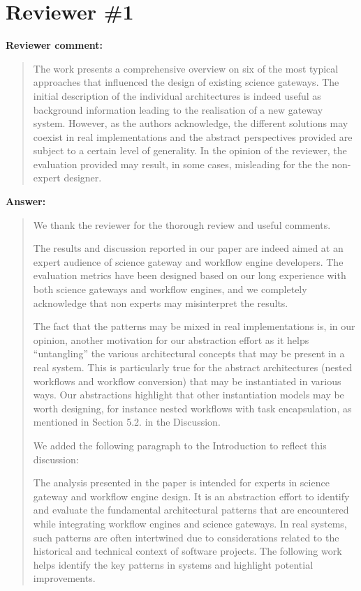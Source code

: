\documentclass[a4]{article}
\newenvironment{review}%
{\textbf{Reviewer comment:}\begin{quote}}%
{\end{quote}}%
\newenvironment{answer}%
{\textbf{Answer:}\begin{small}\begin{quote}}%
{\end{quote}\end{small}}%
\newcommand{\revised}[1]{\color{blue} #1\color{black}\xspace}
\begin{document}
\section{Reviewer \#1}

\begin{review}
  The work presents a comprehensive overview on six of the most
  typical approaches that influenced the design of existing science
  gateways. The initial description of the individual architectures is
  indeed useful as background information leading to the realisation
  of a new gateway system. However, as the authors acknowledge, the
  different solutions may coexist in real implementations and the
  abstract perspectives provided are subject to a certain level of
  generality. In the opinion of the reviewer, the evaluation provided
  may result, in some cases, misleading for the the non-expert
  designer.
\end{review}

\begin{answer}

  We thank the reviewer for the thorough review and useful comments.

  The results and discussion reported in our paper are indeed aimed at
  an expert audience of science gateway and workflow engine
  developers. The evaluation metrics have been designed based on our
  long experience with both science gateways and workflow engines, and
  we completely acknowledge that non experts may misinterpret the
  results.

  The fact that the patterns may be mixed in real implementations is,
  in our opinion, another motivation for our abstraction effort as it
  helps ``untangling'' the various architectural concepts that may be
  present in a real system. This is particularly true for the abstract
  architectures (nested workflows and workflow conversion) that may be
  instantiated in various ways. Our abstractions highlight that other
  instantiation models may be worth designing, for instance nested
  workflows with task encapsulation, as mentioned in Section 5.2. in
  the Discussion.

  We added the following paragraph to the Introduction to reflect this discussion:

\revised{The analysis presented in the paper is intended for
experts in science gateway and workflow engine design. It is an
abstraction effort to identify and evaluate the fundamental
architectural patterns that are encountered while integrating workflow
engines and science gateways. In real systems, such patterns are often
intertwined due to considerations related to the historical and
technical context of software projects. The following work helps
identify the key patterns in systems and highlight potential
improvements.}

\end{answer}
\end{document}
